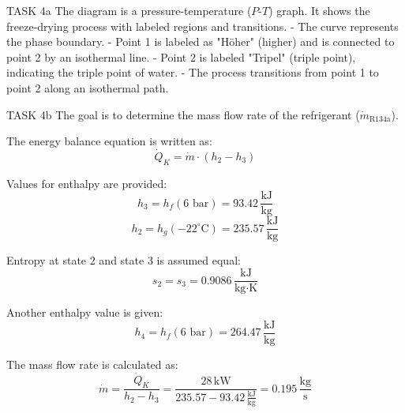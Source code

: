 TASK 4a  
The diagram is a pressure-temperature (\(P\)-\(T\)) graph. It shows the freeze-drying process with labeled regions and transitions.  
- The curve represents the phase boundary.  
- Point 1 is labeled as "Höher" (higher) and is connected to point 2 by an isothermal line.  
- Point 2 is labeled "Tripel" (triple point), indicating the triple point of water.  
- The process transitions from point 1 to point 2 along an isothermal path.  

TASK 4b  
The goal is to determine the mass flow rate of the refrigerant (\( \dot{m}_{\text{R134a}} \)).  

The energy balance equation is written as:  
\[
\dot{Q}_K = \dot{m} \cdot (h_2 - h_3)
\]  

Values for enthalpy are provided:  
\[
h_3 = h_f(\text{6 bar}) = 93.42 \, \frac{\text{kJ}}{\text{kg}}
\]  
\[
h_2 = h_g(-22^\circ\text{C}) = 235.57 \, \frac{\text{kJ}}{\text{kg}}
\]  

Entropy at state 2 and state 3 is assumed equal:  
\[
s_2 = s_3 = 0.9086 \, \frac{\text{kJ}}{\text{kg·K}}
\]  

Another enthalpy value is given:  
\[
h_4 = h_f(\text{6 bar}) = 264.47 \, \frac{\text{kJ}}{\text{kg}}
\]  

The mass flow rate is calculated as:  
\[
\dot{m} = \frac{\dot{Q}_K}{h_2 - h_3} = \frac{28 \, \text{kW}}{235.57 - 93.42 \, \frac{\text{kJ}}{\text{kg}}} = 0.195 \, \frac{\text{kg}}{\text{s}}
\]